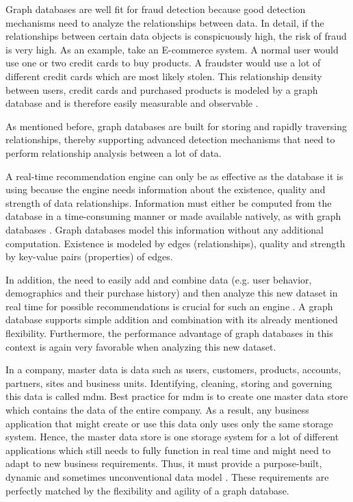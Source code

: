 Graph databases are well fit for fraud detection because good detection mechanisms need to analyze the relationships between data. In detail, if the relationships between certain data objects is conspicuously high, the risk of fraud is very high.  As an example, take an E-commerce system. A normal user would use one or two credit cards to buy products. A fraudster would use a lot of different credit cards which are most likely stolen. This relationship density between users, credit cards and purchased products is modeled by a graph database and is therefore easily measurable and observable \autocite{neo4j:use_cases}.

As mentioned before, graph databases are built for storing and rapidly traversing relationships, thereby supporting advanced detection mechanisms that need to perform relationship analysis between a lot of data.


A real-time recommendation engine can only be as effective as the database it is using because the engine needs information about the existence, quality and strength of data relationships. Information must either be computed from the database in a time-consuming manner or made available natively, as with graph databases \autocite{neo4j:use_cases}. Graph databases model this information without any additional computation. Existence is modeled by edges (relationships), quality and strength by key-value pairs (properties) of edges.

In addition, the need to easily add and combine data (e.g. user behavior, demographics and their purchase history) and then analyze this new dataset in real time for possible recommendations is crucial for such an engine \autocite{neo4j:use_cases}. A graph database supports simple addition and combination with its already mentioned flexibility. Furthermore, the performance advantage of graph databases in this context is again very favorable when analyzing this new dataset.


In a company, master data is data such as users, customers, products, accounts, partners, sites and business units. Identifying, cleaning, storing and governing this data is called \acrfull{mdm}. Best practice for \gls{mdm} is to create one master data store which contains the data of the entire company. As a result, any business application that might create or use this data only uses only the same storage system. Hence, the master data store is one storage system for a lot of different applications which still needs to fully function in real time and might need to adapt to new business requirements. Thus, it must provide a purpose-built, dynamic and sometimes unconventional data model \autocite{neo4j:use_cases}. These requirements are perfectly matched by the flexibility and agility of a graph database.

